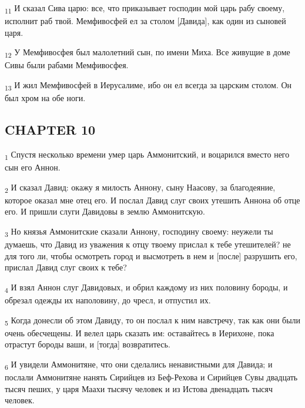 \begin{tcolorbox}
\textsubscript{11} И сказал Сива царю: все, что приказывает господин мой царь рабу своему, исполнит раб твой. Мемфивосфей ел за столом [Давида], как один из сыновей царя.
\end{tcolorbox}
\begin{tcolorbox}
\textsubscript{12} У Мемфивосфея был малолетний сын, по имени Миха. Все живущие в доме Сивы были рабами Мемфивосфея.
\end{tcolorbox}
\begin{tcolorbox}
\textsubscript{13} И жил Мемфивосфей в Иерусалиме, ибо он ел всегда за царским столом. Он был хром на обе ноги.
\end{tcolorbox}
\subsection{CHAPTER 10}
\begin{tcolorbox}
\textsubscript{1} Спустя несколько времени умер царь Аммонитский, и воцарился вместо него сын его Аннон.
\end{tcolorbox}
\begin{tcolorbox}
\textsubscript{2} И сказал Давид: окажу я милость Аннону, сыну Наасову, за благодеяние, которое оказал мне отец его. И послал Давид слуг своих утешить Аннона об отце его. И пришли слуги Давидовы в землю Аммонитскую.
\end{tcolorbox}
\begin{tcolorbox}
\textsubscript{3} Но князья Аммонитские сказали Аннону, господину своему: неужели ты думаешь, что Давид из уважения к отцу твоему прислал к тебе утешителей? не для того ли, чтобы осмотреть город и высмотреть в нем и [после] разрушить его, прислал Давид слуг своих к тебе?
\end{tcolorbox}
\begin{tcolorbox}
\textsubscript{4} И взял Аннон слуг Давидовых, и обрил каждому из них половину бороды, и обрезал одежды их наполовину, до чресл, и отпустил их.
\end{tcolorbox}
\begin{tcolorbox}
\textsubscript{5} Когда донесли об этом Давиду, то он послал к ним навстречу, так как они были очень обесчещены. И велел царь сказать им: оставайтесь в Иерихоне, пока отрастут бороды ваши, и [тогда] возвратитесь.
\end{tcolorbox}
\begin{tcolorbox}
\textsubscript{6} И увидели Аммонитяне, что они сделались ненавистными для Давида; и послали Аммонитяне нанять Сирийцев из Беф-Рехова и Сирийцев Сувы двадцать тысяч пеших, у царя Маахи тысячу человек и из Истова двенадцать тысяч человек.
\end{tcolorbox}
